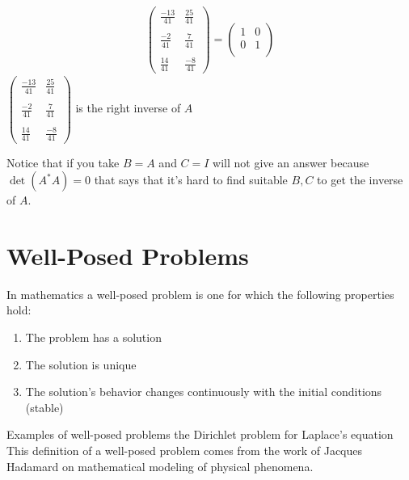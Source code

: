 \begin{example}
\begin{align*}
\begin{pmatrix}
                        \displaystyle \frac{-13}{41} & \displaystyle \frac{25}{41}\\\\
                        \displaystyle \frac{-2}{41} & \displaystyle \frac{7}{41}\\\\
                        \displaystyle \frac{14}{41} & \displaystyle \frac{-8}{41}
                \end{pmatrix} = \begin{pmatrix}
                        1 & 0 \\
                        0 & 1 \\
                    \end{pmatrix}
        \end{align*}
$
\begin{pmatrix}
        \displaystyle \frac{-13}{41} & \displaystyle \frac{25}{41}\\\\
        \displaystyle \frac{-2}{41} & \displaystyle \frac{7}{41}\\\\
        \displaystyle \frac{14}{41} & \displaystyle \frac{-8}{41}
\end{pmatrix}
$ is the right inverse of $A$


Notice that if you take $B = A$ and $C = I$ will not give an answer because $\det(A^{*}A) = 0$
that says that it's hard to find suitable $B,C$ to get the inverse of $A$.
\end{example}


\newpage

\section{Well-Posed Problems}
In mathematics a well-posed problem is one for 
which the following properties hold:

\begin{enumerate}
        \item The problem has a solution
        \item The solution is unique
        \item The solution's behavior changes continuously with the initial conditions (stable)
\end{enumerate}
Examples of well-posed problems the Dirichlet problem for Laplace's equation
\\
This definition of a well-posed problem comes from the work of Jacques Hadamard on mathematical modeling of physical phenomena.

